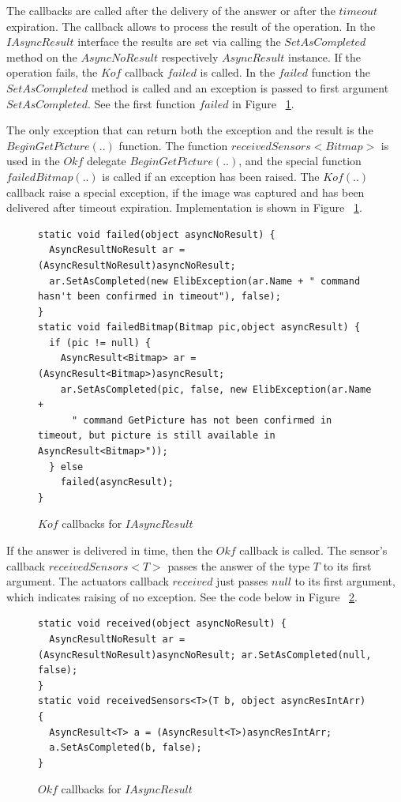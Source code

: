   The callbacks are called after the delivery of the answer or after the $timeout$ expiration.
  The callback allows to process the result of the operation.
  In the $IAsyncResult$ interface the results are set via calling the $SetAsCompleted$ method 
  on the $AsyncNoResult$ respectively $AsyncResult$ instance.
  If the operation fails, the $Kof$ callback $failed$ is called. 
  In the $failed$ function the $SetAsCompleted$ method is called and an exception is passed to first argument $SetAsCompleted$.
  See the first function $failed$ in Figure ~\ref{Ikofs}.

  The only exception that can return both the exception and the result is the $BeginGetPicture(..)$ function.
  The function $receivedSensors<Bitmap>$ is used in the $Okf$ delegate $BeginGetPicture(..)$, and 
  the special function $failedBitmap(..)$ is called if an exception has been raised.
  The $Kof(..)$ callback raise a special exception, if the image was captured and has been 
  delivered after timeout expiration.
  Implementation is shown in Figure ~\ref{Ikofs}. 

  
\begin{figure}[!hbp]
\begin{lstlisting}
static void failed(object asyncNoResult) {
  AsyncResultNoResult ar = (AsyncResultNoResult)asyncNoResult;
  ar.SetAsCompleted(new ElibException(ar.Name + " command hasn't been confirmed in timeout"), false); 
}
static void failedBitmap(Bitmap pic,object asyncResult) {
  if (pic != null) {
    AsyncResult<Bitmap> ar = (AsyncResult<Bitmap>)asyncResult;        
    ar.SetAsCompleted(pic, false, new ElibException(ar.Name + 
      " command GetPicture has not been confirmed in timeout, but picture is still available in AsyncResult<Bitmap>"));
  } else
    failed(asyncResult);
}
\end{lstlisting}	
\caption{$Kof$ callbacks for $IAsyncResult$} \label{Ikofs}
\end{figure}


  If the answer is delivered in time, then the $Okf$ callback is called.
  The sensor's callback $receivedSensors<T>$ passes the answer of the type $T$ to its first argument.
  The actuators callback $received$ just passes $null$ to its first argument, which indicates
  raising of no exception.
  See the code below in Figure ~\ref{Iokfs}.


\begin{figure}[!hbp]
\begin{lstlisting}
static void received(object asyncNoResult) {
  AsyncResultNoResult ar = (AsyncResultNoResult)asyncNoResult; ar.SetAsCompleted(null, false); 
}
static void receivedSensors<T>(T b, object asyncResIntArr) {
  AsyncResult<T> a = (AsyncResult<T>)asyncResIntArr;
  a.SetAsCompleted(b, false);
}
\end{lstlisting}	
\caption{$Okf$ callbacks for $IAsyncResult$} \label{Iokfs}
\end{figure}

